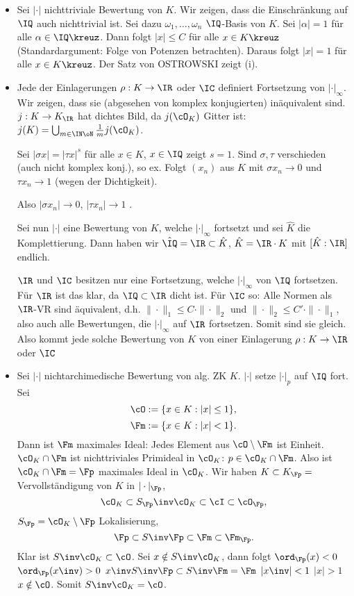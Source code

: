 \begin{Beweis}
 \begin{itemize}
  \item Sei $|\cdot|$ nichttriviale Bewertung von $K$. Wir zeigen, dass die Einschränkung auf $\IQ$ auch nichttrivial ist. Sei dazu $\omega_1,\ldots,\omega_n$ $\IQ$-Basis von $K$. Sei $|\alpha|=1$ für alle $\alpha\in\IQ\kreuz$. Dann folgt $|x|\leq C$ für alle $x\in K\kreuz$ (Standardargument: Folge von Potenzen betrachten). Daraus folgt $|x|=1$ für alle $x\in K\kreuz$. Der Satz von OSTROWSKI zeigt (i).
  \item Jede der Einlagerungen $\rho:K\rightarrow \IR$ oder $\IC$ definiert Fortsetzung von $|\cdot|_\infty$. Wir zeigen, dass sie (abgesehen von komplex konjugierten) inäquivalent sind. $j:K\rightarrow K_\IR$ hat dichtes Bild, da $j(\cO_K)$ Gitter ist: $j(K)=\bigcup_{m\in\IN\oN} \frac{1}{m} j(\cO_K)$.
  
  Sei $|\sigma x|=|\tau x|^s$ für alle $x\in K$, $x\in \IQ$ zeigt $s=1$. Sind $\sigma,\tau$ verschieden (auch nicht komplex konj.), so ex. Folgt $(x_n)$ aus $K$ mit $\sigma x_n\rightarrow 0$ und $\tau x_n\rightarrow 1$ (wegen der Dichtigkeit).
  
  Also $|\sigma x_n|\rightarrow 0$, $|\tau x_n|\rightarrow 1$ \lightning.
  
  Sei nun $|\cdot|$ eine Bewertung von $K$, welche $|\cdot|_\infty$ fortsetzt und sei $\hat K$ die Komplettierung. Dann haben wir $\hat\IQ=\IR\subset \hat K$, $\hat K=\IR\cdot K$ mit $[\hat K: \IR]$ endlich.
  
  $\IR$ und $\IC$ besitzen nur eine Fortsetzung, welche $|\cdot|_\infty$ von $\IQ$ fortsetzen. Für $\IR$ ist das klar, da $\IQ\subset \IR$ dicht ist. Für $\IC$ so: Alle Normen als $\IR$-VR sind äquivalent, d.h. $\|\cdot\|_1\leq C\cdot \|\cdot\|_2$ und $\|\cdot\|_2\leq C'\cdot\|\cdot\|_1$, also auch alle Bewertungen, die $|\cdot|_\infty$ auf $\IR$ fortsetzen. Somit sind sie gleich. Also kommt jede solche Bewertung von $K$ von einer Einlagerung $\rho:K\rightarrow \IR$ oder $\IC$
  \item Sei $|\cdot|$ nichtarchimedische Bewertung von alg. ZK $K$. $|\cdot|$ setze $|\cdot|_p$ auf $\IQ$ fort. Sei
  \[ \cO:=\{ x\in K : |x|\leq 1\},\]
  \[ \Fm:=\{ x\in K : |x|<1\}.\]
  Dann ist $\Fm$ maximales Ideal: Jedes Element aus $\cO\setminus\Fm$ ist Einheit. $\cO_K\cap\Fm$ ist nichttriviales Primideal in $\cO_K$: $p\in\cO_K\cap\Fm$. Also ist $\cO_K\cap \Fm=\Fp$ maximales Ideal in $\cO_K$.
  Wir haben $K\subset K_\Fp = $ Vervollständigung von $K$ in $|\cdot|_\Fp$, \[\cO_K\subset S_\Fp\inv\cO_K \subset \cI\subset \cO_\Fp,\] 
  $S_\Fp=\cO_K\setminus\Fp$ Lokalisierung,
  \[ \Fp\subset S\inv\Fp \subset \Fm \subset \Fm_\Fp.\]
  Klar ist $S\inv\cO_K\subset \cO$. Sei $x\notin S\inv\cO_K$, dann folgt $\ord_\Fp(x)<0$ \folge $\ord_\Fp(x\inv)>0$ \folge $x\inv S\inv\Fp\subset S\inv\Fm=\Fm$ \folge $|x\inv|<1$ \folge $|x|>1$ \folge $x\notin \cO$. Somit $S\inv\cO_K=\cO$.
  

\end{itemize}
\end{Beweis}
